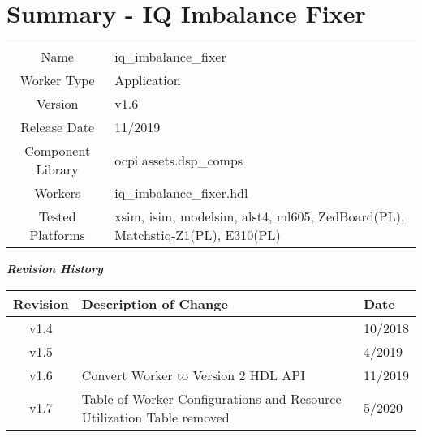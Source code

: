\documentclass{article}
\author{} %
\date{Version \docVersion} %
\title{\docTitle}
\def\docVersion{1.6}
\def\comp{iq\_imbalance\_fixer}
\def\Comp{IQ Imbalance Fixer}
\begin{document}
\section*{Summary - \Comp}
\begin{tabular}{|c|M{13.5cm}|}
	\hline
	                  &                                                              \\
	\hline
	Name              & \comp                                                        \\
	\hline
	Worker Type       & Application                                                  \\
	\hline
	Version           & v\docVersion \\
	\hline
	Release Date      & 11/2019 \\
	\hline
	Component Library & ocpi.assets.dsp\_comps                                        \\
	\hline
	Workers           & \comp.hdl                                                    \\
	\hline
	Tested Platforms  & xsim, isim, modelsim, alst4, ml605, ZedBoard(PL), Matchstiq-Z1(PL), E310(PL) \\
	\hline
\end{tabular}

\begin{center}
	\textit{\textbf{Revision History}}
	\begin{table}[H]
	\label{table:revisions} %
		\begin{tabularx}{\textwidth}{|c|X|l|}
		\hline
		\rowcolor{blue}
		\textbf{Revision} & \textbf{Description of Change} & \textbf{Date} \\
		\hline
		v1.4 & & 10/2018 \\
		\hline
		v1.5 & & 4/2019\\
		\hline
		v1.6 & Convert Worker to Version 2 HDL API & 11/2019\\
		\hline
		v1.7 & Table of Worker Configurations and Resource Utilization Table removed & 5/2020 \\
			\hline
		\end{tabularx}
	\end{table}
\end{center}
\end{document}
